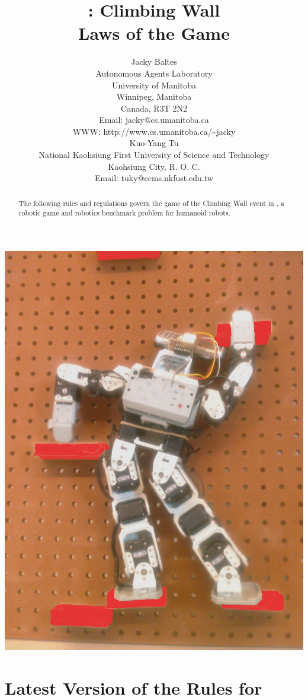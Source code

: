 \documentclass[12pt]{hurocup}
\begin{document}
\title{\HuroCup: Climbing Wall\\
  Laws of the Game \thisyear}

\author{Jacky Baltes\\
Autonomous Agents Laboratory\\
University of Manitoba\\
Winnipeg, Manitoba\\
Canada, R3T 2N2\\
Email: jacky@cs.umanitoba.ca\\
WWW: http://www.cs.umanitoba.ca/\~{ }jacky\\[5mm]
Kuo-Yang Tu\\
National Kaohsiung First University of Science and Technology\\
Kaohsiung City, R. O. C.\\
Email: tuky@ccms.nkfust.edu.tw\\
}

\maketitle

\begin{center}
 \includegraphics[width=0.4\linewidth]{Figures/climbing-wall}
\end{center}

\begin{abstract}
The following rules and regulations govern the game of the Climbing
Wall event in \HuroCup, a robotic game and robotics benchmark problem
for humanoid robots.
%
\end{abstract}

\section*{Latest Version of the Rules for \HuroCup}
\label{sec:updates}
\end{document}

